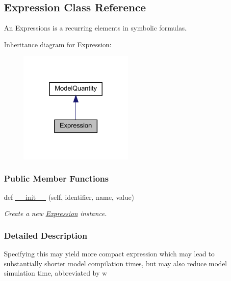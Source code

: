 \hypertarget{classamici_1_1ode__export_1_1_expression}{}\subsection{Expression Class Reference}
\label{classamici_1_1ode__export_1_1_expression}


An Expressions is a recurring elements in symbolic formulas.  




Inheritance diagram for Expression\+:
\nopagebreak
\begin{figure}[H]
\begin{center}
\leavevmode
\includegraphics[width=160pt]{classamici_1_1ode__export_1_1_expression__inherit__graph}
\end{center}
\end{figure}
\subsubsection*{Public Member Functions}
\begin{DoxyCompactItemize}
\item 
def \mbox{\hyperlink{classamici_1_1ode__export_1_1_expression_a258843a3afab00b576ccf386e8673a64}{\+\_\+\+\_\+init\+\_\+\+\_\+}} (self, identifier, name, value)
\begin{DoxyCompactList}\small\item\em Create a new \mbox{\hyperlink{classamici_1_1ode__export_1_1_expression}{Expression}} instance. \end{DoxyCompactList}\end{DoxyCompactItemize}


\subsubsection{Detailed Description}
Specifying this may yield more compact expression which may lead to substantially shorter model compilation times, but may also reduce model simulation time, abbreviated by {\ttfamily w} 

